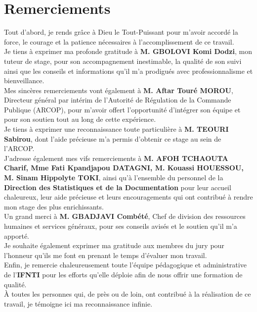 \chapter*{Remerciements}
\thispagestyle{empty}

Tout d’abord, je rends grâce à Dieu le Tout-Puissant pour m’avoir accordé la force, le courage et la patience nécessaires à l’accomplissement de ce travail.\\

Je tiens à exprimer ma profonde gratitude à \textbf{M. GBOLOVI Komi Dodzi}, mon tuteur de stage, pour son accompagnement inestimable, la qualité de son suivi ainsi que les conseils et informations qu’il m’a prodigués avec professionnalisme et bienveillance.\\

Mes sincères remerciements vont également à \textbf{M. Aftar Touré MOROU}, Directeur général par intérim de l’Autorité de Régulation de la Commande Publique (\ac{ARCOP}), pour m’avoir offert l’opportunité d’intégrer son équipe et pour son soutien tout au long de cette expérience.\\

Je tiens à exprimer une reconnaissance toute particulière à \textbf{M. TEOURI Sabirou}, dont l’aide précieuse m’a permis d’obtenir ce stage au sein de l’\ac{ARCOP}.\\

J’adresse également mes vifs remerciements à \textbf{M. AFOH TCHAOUTA Charif, Mme Fati Kpandjapou DATAGNI, M. Kouassi HOUESSOU, M. Sinam Hippolyte TOKI}, ainsi qu’à l’ensemble du personnel de la \textbf{Direction des Statistiques et de la Documentation} pour leur accueil chaleureux, leur aide précieuse et leurs encouragements qui ont contribué à rendre mon stage des plus enrichissants.\\

Un grand merci à \textbf{M. GBADJAVI Combété}, Chef de division des ressources humaines et services généraux, pour ses conseils avisés et le soutien qu’il m’a apporté.\\

Je souhaite également exprimer ma gratitude aux membres du jury pour l’honneur qu’ils me font en prenant le temps d’évaluer mon travail.\\

Enfin, je remercie chaleureusement toute l’équipe pédagogique et administrative de l’\textbf{\ac{IFNTI}} pour les efforts qu’elle déploie afin de nous offrir une formation de qualité.\\

À toutes les personnes qui, de près ou de loin, ont contribué à la réalisation de ce travail, je témoigne ici ma reconnaissance infinie.


\clearpage